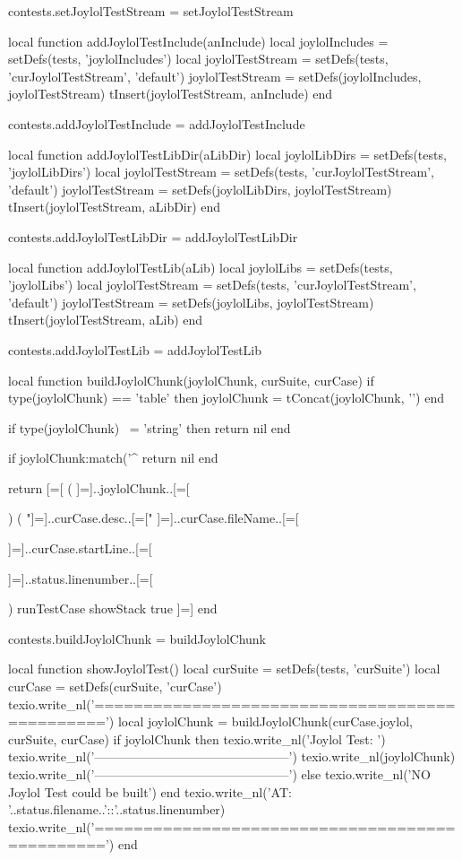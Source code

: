 contests.setJoylolTestStream = setJoylolTestStream

local function addJoylolTestInclude(anInclude)
  local joylolIncludes   = setDefs(tests, 'joylolIncludes')
  local joylolTestStream = setDefs(tests, 'curJoylolTestStream', 'default')
  joylolTestStream       = setDefs(joylolIncludes, joylolTestStream)
  tInsert(joylolTestStream, anInclude)
end

contests.addJoylolTestInclude = addJoylolTestInclude

local function addJoylolTestLibDir(aLibDir)
  local joylolLibDirs    = setDefs(tests, 'joylolLibDirs')
  local joylolTestStream = setDefs(tests, 'curJoylolTestStream', 'default')
  joylolTestStream       = setDefs(joylolLibDirs, joylolTestStream)
  tInsert(joylolTestStream, aLibDir)
end

contests.addJoylolTestLibDir = addJoylolTestLibDir

local function addJoylolTestLib(aLib)
  local joylolLibs       = setDefs(tests, 'joylolLibs')
  local joylolTestStream = setDefs(tests, 'curJoylolTestStream', 'default')
  joylolTestStream       = setDefs(joylolLibs, joylolTestStream)
  tInsert(joylolTestStream, aLib)
end

contests.addJoylolTestLib = addJoylolTestLib
\stopLuaCode

\startLuaCode
local function buildJoylolChunk(joylolChunk, curSuite, curCase)
  if type(joylolChunk) == 'table' then
    joylolChunk = tConcat(joylolChunk, '\n')
  end

  if type(joylolChunk) ~= 'string' then
    return nil
  end

  if joylolChunk:match('^%
    return nil
  end

  return [=[
(
]=]..joylolChunk..[=[

)
(
 "]=]..curCase.desc..[=["
  ]=]..curCase.fileName..[=[

  ]=]..curCase.startLine..[=[

  ]=]..status.linenumber..[=[

)
runTestCase
showStack
true
]=]
end

contests.buildJoylolChunk = buildJoylolChunk

local function showJoylolTest()
  local curSuite = setDefs(tests, 'curSuite')
  local curCase  = setDefs(curSuite, 'curCase')
  texio.write_nl('===============================================')
  local joylolChunk =
    buildJoylolChunk(curCase.joylol, curSuite, curCase)
  if joylolChunk then
    texio.write_nl('Joylol Test: ')
    texio.write_nl('-----------------------------------------------')
    texio.write_nl(joylolChunk)
    texio.write_nl('-----------------------------------------------')
  else
    texio.write_nl('NO Joylol Test could be built')
  end
  texio.write_nl('AT: '..status.filename..'::'..status.linenumber)
  texio.write_nl('===============================================')
end

